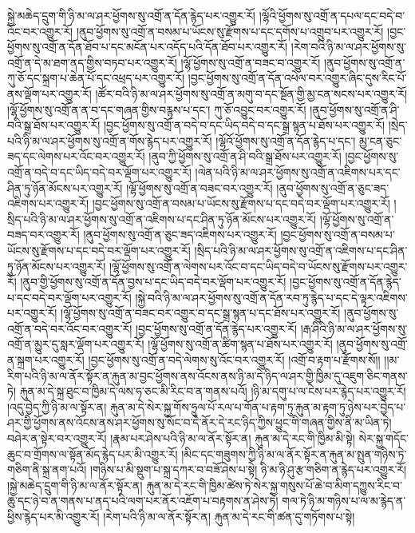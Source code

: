 སྐྱེ་མཆེད་དྲུག་གི་ཉི་མ་ལ་ཤར་ཕྱོགས་སུ་འགྲོ་ན་དོན་རྙེད་པར་འགྱུར་རོ། །ལྷོའི་ཕྱོགས་སུ་འགྲོ་ན་དཔལ་དང་བདེ་བ་འོང་བར་འགྱུར་རོ། །ནུབ་ཕྱོགས་སུ་འགྲོ་ན་བསམ་པ་ཡོངས་སུ་རྫོགས་པ་དང་དགོས་པ་འགྲུབ་པར་འགྱུར་རོ། །བྱང་ཕྱོགས་སུ་འགྲོ་ན་དོན་ཐོབ་པ་དང་མངོན་པར་འདོད་པའི་དོན་ཐོབ་པར་འགྱུར་རོ། །རེག་བའི་ཉི་མ་ལ་ཤར་ཕྱོགས་སུ་འགྲོ་ན་དེ་མ་ཐག་ནད་གྱིས་བཏབ་པར་འགྱུར་རོ། །ལྷོ་ཕྱོགས་སུ་འགྲོ་ན་བཟང་བ་འགྱུར་རོ། །ནུབ་ཕྱོགས་སུ་འགྲོ་ན་ཀུ་ཅོ་དང་སྐྲག་པ་ཆེན་པོ་དང་འཕྲད་པར་འགྱུར་རོ། །བྱང་ཕྱོགས་སུ་འགྲོ་ན་དོན་འཕེལ་བར་འགྱུར་ཞིང་དུས་རིང་པོ་ནས་ལྡོག་པར་འགྱུར་རོ། །ཚོར་བའི་ཉི་མ་ལ་ཤར་ཕྱོགས་སུ་འགྲོ་ན་མགུ་བ་དང་སྔོན་གྱི་མྱ་ངན་སངས་པར་འགྱུར་རོ། །ལྷོ་ཕྱོགས་སུ་འགྲོ་ན་ན་བ་དང་གཞན་གྱིས་བརྙས་པ་དང་། ཀུ་ཅོ་འབྱུང་བར་འགྱུར་རོ། །ནུབ་ཕྱོགས་སུ་འགྲོ་ན་ཤི་བའི་སྒྲ་ཐོས་པར་འགྱུར་རོ། །བྱང་ཕྱོགས་སུ་འགྲོ་ན་བདེ་བ་དང་ཡིད་བདེ་བ་དང་སྒྲ་སྙན་པ་ཐོས་པར་འགྱུར་རོ། །སྲེད་པའི་ཉི་མ་ལ་ཤར་ཕྱོགས་སུ་འགྲོ་ན་གོས་རྙེད་པར་འགྱུར་རོ། །ལྷོའོ་ཕྱོགས་སུ་འགྲོ་ན་དོན་རྙེད་པ་དང་། མྱ་ངན་ཅུང་ཟད་དང་ལེགས་པར་འོང་བར་འགྱུར་རོ། །ནུབ་ཀྱི་ཕྱོགས་སུ་འགྲོ་ན་ཤི་བའི་སྒྲ་ཐོས་པར་འགྱུར་རོ། །བྱང་ཕྱོགས་སུ་འགྲོ་ན་བདེ་བ་དང་ཡིད་བདེ་བར་ལྡོག་པར་འགྱུར་རོ། །ལེན་པའི་ཉི་མ་ལ་ཤར་ཕྱོགས་སུ་འགྲོ་ན་འཇིགས་པར་དང་ཤིན་ཏུ་ཉོན་མོངས་པར་འགྱུར་རོ། །ལྷོ་ཕྱོགས་སུ་འགྲོ་ན་བཟང་བར་འགྱུར་རོ། །ནུབ་ཕྱོགས་སུ་འགྲོ་ན་ཅུང་ཟད་འཇིགས་པར་འགྱུར་རོ། །བྱང་ཕྱོགས་སུ་འགྲོ་ན་བསམ་པ་ཡོངས་སུ་རྫོགས་པ་དང་བདེ་བར་ལྡོག་པར་འགྱུར་རོ། །སྲིད་པའི་ཉི་མ་ལ་ཤར་ཕྱོགས་སུ་འགྲོ་ན་འཇིགས་པ་དང་ཤིན་ཏུ་ཉོན་མོངས་པར་འགྱུར་རོ། །ལྷོ་ཕྱོགས་སུ་འགྲོ་ན་བཟད་བར་འགྱུར་རོ། །ནུབ་ཕྱོགས་སུ་འགྲོ་ན་ཅུང་ཟད་འཇིགས་པར་འགྱུར་རོ། །བྱང་ཕྱོགས་སུ་འགྲོ་ན་བསམ་པ་ཡོངས་སུ་རྫོགས་པ་དང་བདེ་བར་ལྡོག་པར་འགྱུར་རོ། །སྲིད་པའི་ཉི་མ་ལ་ཤར་ཕྱོགས་སུ་འགྲོ་ན་འཇིགས་པ་དང་ཤིན་ཏུ་ཉོན་མོངས་པར་འགྱུར་རོ། །ལྷོ་ཕྱོགས་སུ་འགྲོ་ན་ལེགས་པར་འོང་བ་དང་ཡིད་བདེ་བ་ཡོངས་སུ་རྫོགས་པར་འགྱུར་རོ། །ནུབ་གྱི་ཕྱོགས་སུ་འགྲོ་ན་དོན་བྱས་པ་དང་ཡིད་བདེ་བར་ལྡོག་པར་འགྱུར་རོ། །བྱང་ཕྱོགས་སུ་འགྲོ་ན་དོན་རྙེད་པ་དང་བདེ་བར་ལྡོག་པར་འགྱུར་རོ། །སྐྱེ་བའི་ཉི་མ་ལ་ཤར་ཕྱོགས་སུ་འགྲོ་ན་དོན་རབ་ཏུ་རྙེད་པ་དང་དེ་ལྟར་འཇིགས་པར་འགྱུར་རོ། །ལྷོ་ཕྱོགས་སུ་འགྲོ་ན་བཟང་བར་འགྱུར་བ་དང་སྒྲ་སྙན་པ་དང་ཐོས་པར་འགྱུར་རོ། །ནུབ་ཕྱོགས་སུ་འགྲོ་ན་བདེ་བར་འོང་བར་འགྱུར་རོ། །བྱང་ཕྱོགས་སུ་འགྲོ་ན་དོན་རྙེད་པར་འགྱུར་རོ། །རྒ་ཤིའི་ཉི་མ་ལ་ཤར་ཕྱོགས་སུ་འགྲོ་ན་མྱུར་དུ་སླར་ལྡོག་པར་འགྱུར་རོ། །ལྷོ་ཕྱོགས་སུ་འགྲོ་ན་ཚིག་སྙན་པ་ཐོས་པར་འགྱུར་རོ། །ནུབ་ཕྱོགས་སུ་འགྲོ་ན་སྐྲག་པར་འགྱུར་རོ། །བྱང་ཕྱོགས་སུ་འགྲོ་ན་བདེ་ལེགས་སུ་འོང་བར་འགྱུར་རོ། །འགྲོ་བ་རྟག་པ་རྫོགས་སོ།། །།མ་རིག་པའི་ཉི་མ་ལ་ནོར་སྟོར་ན་རྐུན་མ་བྱང་ཕྱོགས་ནས་འོངས་ནས་ཉི་མ་དེ་ཉིད་ལ་ཤར་གྱི་ཁྱིམ་དུ་འཇུག་ཅིང་གནས་ཏེ། རྐུན་མ་དེ་སྐྲ་ཐུང་བ་ཁྱིམ་དེ་ལས་ཧ་ཅང་མི་རིང་བ་ན་གནས་པའོ། །ཉི་མ་དགུ་པ་ལ་ངེས་པར་རྙེད་པར་འགྱུར་རོ། །འདུ་བྱེད་ཀྱི་ཉི་མ་ལ་སྟོར་ན། རྐུན་མ་དེ་སེར་སྐྱ་གོས་ཧྲུལ་པོ་རལ་པ་གོན་པ་རྟག་ཏུ་རྐུན་མ་རྟག་ཏུ་ཉེས་པར་བྱེད་པ་ཤར་གྱི་ཕྱོགས་ནས་འོངས་ནས་ཤར་ཕྱོགས་སུ་སོང་བ་དེ་ནོར་དེ་རང་ཉིད་ཀྱིས་ཕྱུང་གི་གཞན་གྱིས་ནི་མ་ཡིན་ཏེ། བཤེར་ན་སྟེར་བར་འགྱུར་རོ། །རྣམ་པར་ཤེས་པའི་ཉི་མ་ལ་ནོར་སྟོར་ན། རྐུན་མ་དེ་རང་གི་ཁྱིམ་མི་སྟེ། སེར་སྐྱ་གདོང་ཆུང་བ་གྲོགས་ལ་སྟོན་མོད་རྙེད་པར་མི་འགྱུར་རོ། །མིང་དང་གཟུགས་ཀྱི་ཉི་མ་ལ་ནོར་སྟོར་ན་རྐུན་མ་སྤུན་གཉིས་ཏེ་གཅིག་ནི་སྐྲ་ནག་པའོ། །གཉིས་པ་མི་སྡུག་པ་སྐྲ་དཀར་བ་བཟོ་ཤེས་པ་སྟེ། ཉི་མ་ཉི་ཤུ་རྩ་གཅིག་ན་རྙེད་པར་འགྱུར་རོ། །སྐྱེ་མཆེད་དྲུག་གི་ཉི་མ་ལ་ནོར་སྟོར་ན། རྐུན་མ་དེ་རང་གི་ཁྱིམ་ཚེས་ཏེ་སེར་སྐྱ་གསུས་པོ་ཆེ་བ་མིག་དཀྱུས་རིང་བ་ཆུ་དང་ཉེ་བ་ན་གནས་པ་ནད་པའི་ལག་པར་ནོར་འཇོག་པ་བརྟགས་ན་ཤེས་ཏེ། གལ་ཏེ་ཉི་མ་གཉིས་པ་ལ་མ་རྙེད་ན་ཕྱིས་རྙེད་པར་མི་འགྱུར་རོ། །རེག་པའི་ཉི་མ་ལ་ནོར་སྟོར་ན། རྐུན་མ་དེ་རང་གི་ཚན་དུ་གཏོགས་པ་སྟེ། 